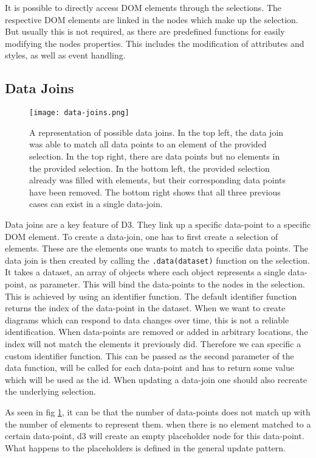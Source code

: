 It is possible to directly access DOM elements through the selections. The respective DOM elements are linked in the nodes which make up the selection. But usually this is not required, as there are predefined functions for easily modifying the nodes properties. This includes the modification of attributes and styles, as well as event handling. 

\subsection{Data Joins}

\begin{figure}
    \texttt{[image: data-joins.png]}
    \caption[data-joins]{A representation of possible data joins. In the top left, the data join was able to match all data points to an element of the provided selection. In the top right, there are data points but no elements in the provided selection. In the bottom left, the provided selection already was filled with elements, but their corresponding data points have been removed. The bottom right shows that all three previous cases can exist in a single data-join.}
    \label{fig:data-joins}
\end{figure}


Data joins are a key feature of D3. They link up a specific data-point to a specific DOM element. To create a data-join, one has to first create a selection of elements. These are the elements one wants to match to specific data points. The data join is then created by calling the \verb|.data(dataset)| function on the selection. It takes a dataset, an array of objects where each object represents a single data-point, as parameter. This will bind the data-points to the nodes in the selection. This is achieved by using an identifier function. The default identifier function returns the index of the data-point in the dataset. When we want to create diagrams which can respond to data changes over time, this is not a reliable identification. When data-points are removed or added in arbitrary locations, the index will not match the elements it previously did. Therefore we can specific a custom identifier function. This can be passed as the second parameter of the data function, will be called for each data-point and has to return some value which will be used as the id. When updating a data-join one should also recreate the underlying selection.

As seen in fig \ref{fig:data-joins}, it can be that the number of data-points does not match up with the number of elements to represent them. when there is no element matched to a certain data-point, d3 will create an empty placeholder node for this data-point. What happens to the placeholders is defined in the general update pattern.

